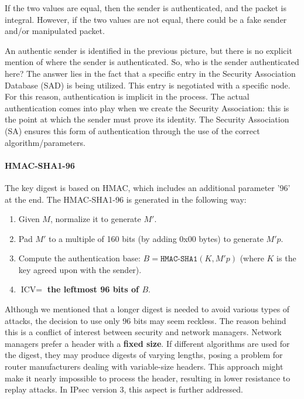 If the two values are equal, then the sender is authenticated, and the packet is integral. However, if the two values are not equal, there could be a fake sender and/or manipulated packet.

An authentic sender is identified in the previous picture, but there is no explicit mention of where the sender is authenticated. So, who is the sender authenticated here? The answer lies in the fact that a specific entry in the Security Association Database (SAD) is being utilized. This entry is negotiated with a specific node. For this reason, authentication is implicit in the process. The actual authentication comes into play when we create the Security Association: this is the point at which the sender must prove its identity. The Security Association (SA) ensures this form of authentication through the use of the correct algorithm/parameters.


\paragraph{HMAC-SHA1-96}
The key digest is based on HMAC, which includes an additional parameter '96' at the end. The HMAC-SHA1-96 is generated in the following way:

\begin{enumerate}
    \item Given $M$, normalize it to generate $M'$.
    \item Pad $M'$ to a multiple of 160 bits (by adding 0x00 bytes) to generate $M'p$.
    \item Compute the authentication base: $B = \texttt{HMAC-SHA1}(K, M'p)$ (where $K$ is the key agreed upon with the sender).
    \item $\text{ICV} = $ \textbf{the leftmost 96 bits of $B$}.
\end{enumerate}

Although we mentioned that a longer digest is needed to avoid various types of attacks, the decision to use only 96 bits may seem reckless. The reason behind this is a conflict of interest between security and network managers. Network managers prefer a header with a \textbf{fixed size}. If different algorithms are used for the digest, they may produce digests of varying lengths, posing a problem for router manufacturers dealing with variable-size headers. This approach might make it nearly impossible to process the header, resulting in lower resistance to replay attacks. In IPsec version 3, this aspect is further addressed.

